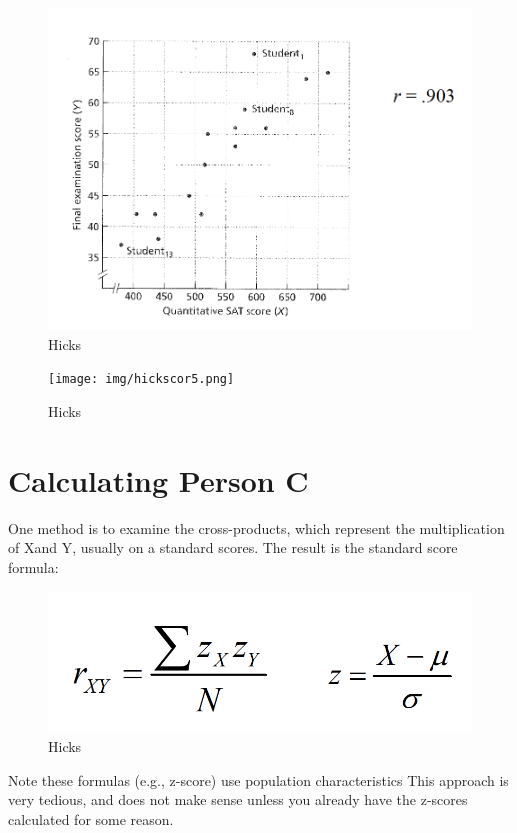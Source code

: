 \documentclass[]{book}
\theoremstyle{definition}
\theoremstyle{definition}
\theoremstyle{definition}
\theoremstyle{remark}
\begin{document}
{\begin{figure}
\centering
\includegraphics{img/hickscor4.png}
\caption{Hicks}
\end{figure}

\begin{figure}
\centering
\texttt{[image: img/hickscor5.png]}
\caption{Hicks}
\end{figure}

\section{Calculating Person C}\label{calculating-person-c}

One method is to examine the cross-products, which represent the
multiplication of Xand Y, usually on a standard scores. The result is
the standard score formula:

\begin{figure}
\centering
\includegraphics{img/hickscor6.png}
\caption{Hicks}
\end{figure}

Note these formulas (e.g., z-score) use population characteristics This
approach is very tedious, and does not make sense unless you already
have the z-scores calculated for some reason.

}
\end{document}
